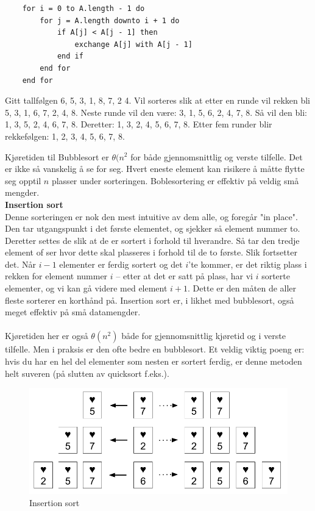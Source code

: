 \begin{lstlisting}
    for i = 0 to A.length - 1 do
    	for j = A.length downto i + 1 do
		    if A[j] < A[j - 1] then
		    	exchange A[j] with A[j - 1]
		    end if
	    end for
    end for
\end{lstlisting}

\begin{boxed}
Gitt tallfølgen 6, 5, 3, 1, 8, 7, 2 4. Vil sorteres slik at etter en runde vil rekken bli 5, 3, 1, 6, 7, 2, 4, 8. Neste runde vil den være: 3, 1, 5, 6, 2, 4, 7, 8. Så vil den bli: 1, 3, 5, 2, 4, 6, 7, 8. Deretter: 1, 3, 2, 4, 5, 6, 7, 8. Etter fem runder blir rekkefølgen: 1, 2, 3, 4, 5, 6, 7, 8.
\end{boxed}

\noindent Kjøretiden til Bubblesort er \textbf{$\theta(n^2$} for både gjennomsnittlig og verste tilfelle. Det er ikke så vanskelig å se for seg. Hvert eneste element kan risikere å måtte flytte seg opptil $n$ plasser under sorteringen. Boblesortering er effektiv på veldig små mengder.\\

\noindent \textbf{Insertion sort}\\
Denne sorteringen er nok den mest intuitive av dem alle, og foregår "in place". Den tar utgangspunkt i det første elementet, og sjekker så element nummer to. Deretter settes de slik at de er sortert i forhold til hverandre. Så tar den tredje element of ser hvor dette skal plasseres i forhold til de to første. Slik fortsetter det. Når $i - 1$ elementer er ferdig sortert og det $i$'te kommer, er det riktig plass i rekken for element nummer $i$ – etter at det er satt på plass, har vi $i$ sorterte elementer, og vi kan gå videre med element $i + 1$. Dette er den måten de aller fleste sorterer en korthånd på. Insertion sort er, i likhet med bubblesort, også meget effektiv på små datamengder. 
\\\\
Kjøretiden her er også \textbf{$\theta(n^2)$} både for gjennomsnittlig kjøretid og i verste tilfelle. Men i praksis er den ofte bedre en bubblesort. Et veldig viktig poeng er: hvis du har en hel del elementer som nesten er sortert ferdig, er denne metoden helt suveren (på slutten av quicksort f.eks.). 

\begin{figure}[H]
\includegraphics[scale=0.5]{images/insertionsort}
\centering %
\caption{Insertion sort}
\label{fig:insertionsort}
\end{figure}

